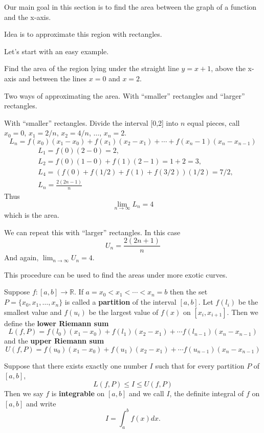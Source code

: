 \documentclass[calc1-main.tex]{subfiles}
\begin{document}
Our main goal in this section is to find the area between the graph of a function and the x-axis.

Idea is to approximate this region with rectangles.

Let's start with an easy example.
\begin{example}
  Find the area of the region lying under the straight line $y=x+1$, above the x-axis and between the lines $x=0$ and $x=2$.
\end{example}

\begin{solution}
  Two ways of approximating the area. With ``smaller'' rectangles and ``larger'' rectangles.

  With ``smaller'' rectangles. Divide the interval [0,2] into $n$ equal pieces, call $x_0=0$, $x_1=2/n$, $x_2=4/n$, $\dots$, $x_n=2$.
  \[
    L_n = f(x_0) (x_1 - x_0) + f(x_1) (x_2-x_1) + \cdots + f(x_n-1) (x_n-x_{n-1})
  \]
  \begin{align*}
  & L_1 = f(0) (2-0) = 2, \\
  & L_2 = f(0) (1-0) +f(1) (2-1) = 1 + 2 = 3, \\
  & L_4 = (f(0) + f(1/2) + f(1) + f(3/2)) (1/2) = 7/2, \\
  & L_n = \frac{2(2n-1)}{n}
  \end{align*}
  Thus
  \[
    \lim_{n \to \infty} L_n = 4
  \]
  which is the area.

  We can repeat this with ``larger'' rectangles. In this case
  \[
    U_n = \frac{2(2n+1)}{n}
  \]
  And again, $\lim_{n \to \infty} U_n = 4$.
\end{solution}

This procedure can be used to find the areas under more exotic curves.
\begin{definition}
  Suppose $f:[a,b] \to \mathbb{R}$.
  If $a=x_0 < x_1 < \cdots < x_n = b$ then the set $P=\{x_0, x_1, \dots, x_n\}$ is called a \textbf{partition} of the interval $[a,b]$.
  Let $f(l_i)$ be the smallest value and $f(u_i)$ be the largest value of $f(x)$ on $[x_i, x_{i+1}]$. Then we define the \textbf{lower Riemann sum}
  \[
    L(f, P) = f(l_0) (x_1-x_0) + f(l_1) (x_2-x_1) + \cdots f(l_{n-1}) (x_n - x_{n-1})
  \]
  and the \textbf{upper Riemann sum}
  \[
    U(f, P) = f(u_0) (x_1-x_0) + f(u_1) (x_2-x_1) + \cdots f(u_{n-1}) (x_n - x_{n-1})
  \]

  Suppose that there exists exactly one number $I$ such that for every partition $P$ of $[a, b]$,
  \[
    L(f, P) \le I \le U(f, P)
  \]
  Then we say $f$ is \textbf{integrable} on $[a, b]$ and we call $I$, the definite integral of $f$ on $[a,b]$ and write
  \[
    I = \int_a^b f(x) dx.
  \]
\end{definition}
\end{document}
